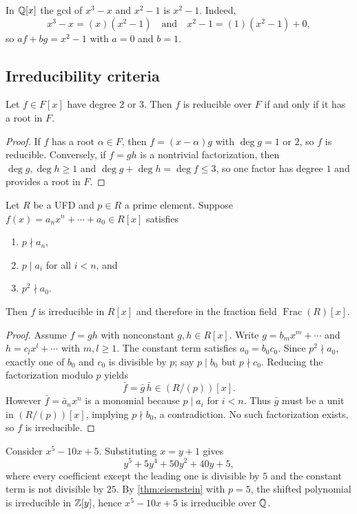 \begin{example}
In $\mathbb{Q}[x]$ the gcd of $x^3-x$ and $x^2-1$ is $x^2-1$. Indeed,
\[
x^3-x=(x)(x^2-1)\quad\text{and}\quad x^2-1=(1)(x^2-1)+0,
\]
so $af+bg=x^2-1$ with $a=0$ and $b=1$.
\end{example}

\subsection{Irreducibility criteria}
\begin{proposition}[Degree $2$ or $3$]\label{prop:deg23}
Let $f\in F[x]$ have degree $2$ or $3$. Then $f$ is reducible over $F$ if and only if it has a root in $F$.
\end{proposition}
\begin{proof}
If $f$ has a root $\alpha\in F$, then $f=(x-\alpha)g$ with $\deg g=1$ or $2$, so $f$ is reducible. Conversely, if $f=gh$ is a nontrivial factorization, then $\deg g,\deg h\ge1$ and $\deg g+\deg h=\deg f\le3$, so one factor has degree $1$ and provides a root in $F$.
\end{proof}

\begin{theorem}[Eisenstein]\label{thm:eisenstein}
Let $R$ be a UFD and $p\in R$ a prime element. Suppose $f(x)=a_nx^n+\cdots+a_0\in R[x]$ satisfies
\begin{enumerate}
 \item $p\nmid a_n$,
 \item $p\mid a_i$ for all $i<n$, and
 \item $p^2\nmid a_0$.
\end{enumerate}
Then $f$ is irreducible in $R[x]$ and therefore in the fraction field $\operatorname{Frac}(R)[x]$.
\end{theorem}
\begin{proof}
Assume $f=gh$ with nonconstant $g,h\in R[x]$. Write $g=b_mx^m+\cdots$ and $h=c_lx^l+\cdots$ with $m,l\ge1$. The constant term satisfies $a_0=b_0c_0$. Since $p^2\nmid a_0$, exactly one of $b_0$ and $c_0$ is divisible by $p$; say $p\mid b_0$ but $p\nmid c_0$. Reducing the factorization modulo $p$ yields
\[
\bar f=\bar g\,\bar h\in(R/(p))[x].
\]
However $\bar f=\bar a_n x^n$ is a monomial because $p\mid a_i$ for $i<n$. Thus $\bar g$ must be a unit in $(R/(p))[x]$, implying $p\nmid b_0$, a contradiction. No such factorization exists, so $f$ is irreducible.
\end{proof}

\begin{example}
Consider $x^5-10x+5$. Substituting $x=y+1$ gives
\[
y^5+5y^4+50y^2+40y+5,
\]
where every coefficient except the leading one is divisible by $5$ and the constant term is not divisible by $25$. By \cref{thm:eisenstein} with $p=5$, the shifted polynomial is irreducible in $\mathbb{Z}[y]$, hence $x^5-10x+5$ is irreducible over $\mathbb{Q}$.
\end{example}

